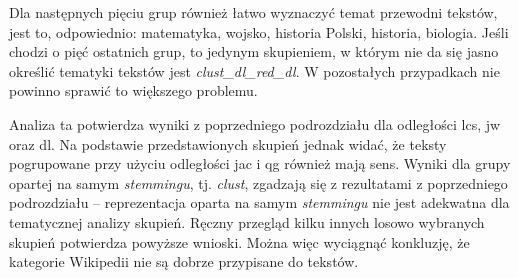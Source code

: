 \documentclass{praca1}
\begin{document}
Dla następnych pięciu grup również łatwo wyznaczyć temat przewodni tekstów, jest to, odpowiednio: matematyka, wojsko, historia Polski, historia, biologia. Jeśli chodzi o pięć ostatnich grup, to jedynym skupieniem, w którym nie da się jasno określić tematyki tekstów jest \emph{clust\_dl\_red\_dl}. W pozostałych przypadkach nie powinno sprawić to większego problemu.

Analiza ta potwierdza wyniki z poprzedniego podrozdziału dla odległości lcs, jw oraz dl. Na podstawie przedstawionych skupień jednak widać, że teksty pogrupowane przy użyciu odległości jac i qg również mają sens. Wyniki dla grupy opartej na samym \emph{stemmingu}, tj. \emph{clust}, zgadzają się z rezultatami z poprzedniego podrozdziału -- reprezentacja oparta na samym \emph{stemmingu} nie jest adekwatna dla tematycznej analizy skupień. Ręczny przegląd kilku innych losowo wybranych skupień potwierdza powyższe wnioski. Można więc wyciągnąć konkluzję, że kategorie Wikipedii nie są dobrze przypisane do tekstów.
\end{document}
